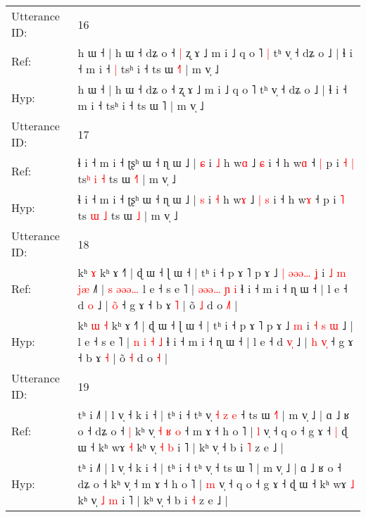 \documentclass[10pt]{article}
\DeclareRobustCommand{\hl}[1]{{\textcolor{red}{#1}}}
\begin{document}
\begin{longtable}{ll}
 \\
\midrule
Utterance ID: & 16 \\
Ref: & h ɯ ˧ | h ɯ ˧ dʑ o ˧\hl{ }\hl{|} ʐ ɤ ˩ m i ˩ q o ˥\hl{ }\hl{|} tʰ v̩ ˧ dʑ o ˩ | ɬ i ˧ m i ˧\hl{ }\hl{|} tsʰ i ˧ ts ɯ \hl{˧}˥ | m v̩ ˩
 \\
Hyp: & h ɯ ˧ | h ɯ ˧ dʑ o ˧\hl{}\hl{} ʐ ɤ ˩ m i ˩ q o ˥\hl{}\hl{} tʰ v̩ ˧ dʑ o ˩ | ɬ i ˧ m i ˧\hl{}\hl{} tsʰ i ˧ ts ɯ \hl{}˥ | m v̩ ˩
 \\
\midrule
Utterance ID: & 17 \\
Ref: & ɬ i ˧ m i ˧ ʈʂʰ ɯ ˧ ɳ ɯ ˩ | \hl{ɕ} i \hl{˩} h w\hl{ɑ} ˩\hl{}\hl{} \hl{ɕ} i ˧ h w\hl{ɑ} ˧\hl{ }\hl{|} p i\hl{ }\hl{˧} \hl{|} ts\hl{ʰ} \hl{i} \hl{˧} ts ɯ \hl{˧}\hl{˥} | m v̩ ˩
 \\
Hyp: & ɬ i ˧ m i ˧ ʈʂʰ ɯ ˧ ɳ ɯ ˩ | \hl{s} i \hl{˧} h w\hl{ɤ} ˩\hl{ }\hl{|} \hl{s} i ˧ h w\hl{ɤ} ˧\hl{}\hl{} p i\hl{}\hl{} \hl{˥} ts\hl{} \hl{ɯ} \hl{˩} ts ɯ \hl{}\hl{˩} | m v̩ ˩
 \\
\midrule
Utterance ID: & 18 \\
Ref: & kʰ\hl{}\hl{} \hl{ɤ} kʰ ɤ ˧˥ | ɖ ɯ ˧ ɭ ɯ ˧ | tʰ i ˧ p ɤ ˥ p ɤ ˩\hl{ }\hl{|}\hl{ }\hl{ə}\hl{ə}\hl{ə}\hl{…} \hl{ʝ} i \hl{˩} \hl{m} \hl{j}\hl{æ} ˩\hl{˥} |\hl{ }\hl{s}\hl{ }\hl{ə}\hl{ə}\hl{ə}\hl{…} l e ˧ s e ˥ | \hl{ə}\hl{ə}\hl{ə}\hl{…} \hl{ɲ} \hl{i} ɬ i ˧ m i ˧ ɳ ɯ ˧ | l e ˧ d \hl{}\hl{o} ˩ |\hl{}\hl{} \hl{o}\hl{̃} ˧ g ɤ ˧ b ɤ \hl{˥} | õ \hl{˩} d o \hl{˩}\hl{˥} |
 \\
Hyp: & kʰ\hl{ }\hl{ɯ} \hl{˧} kʰ ɤ ˧˥ | ɖ ɯ ˧ ɭ ɯ ˧ | tʰ i ˧ p ɤ ˥ p ɤ ˩\hl{}\hl{}\hl{}\hl{}\hl{}\hl{}\hl{} \hl{m} i \hl{˧} \hl{s} \hl{}\hl{ɯ} ˩\hl{} |\hl{}\hl{}\hl{}\hl{}\hl{}\hl{}\hl{} l e ˧ s e ˥ | \hl{}\hl{n}\hl{ }\hl{i} \hl{˧} \hl{˩} ɬ i ˧ m i ˧ ɳ ɯ ˧ | l e ˧ d \hl{v}\hl{̩} ˩ |\hl{ }\hl{h} \hl{v}\hl{̩} ˧ g ɤ ˧ b ɤ \hl{˧} | õ \hl{˧} d o \hl{}\hl{˧} |
 \\
\midrule
Utterance ID: & 19 \\
Ref: & tʰ i ˩˥ | l v̩ ˧ k i ˧ | tʰ i ˧ tʰ v̩\hl{ }\hl{˧}\hl{ }\hl{z}\hl{ }\hl{e} ˧ ts ɯ \hl{˧}˥ | m v̩ ˩ | ɑ ˩ ʁ o ˧ dʑ o ˧\hl{ }\hl{|} kʰ v̩\hl{ }\hl{˧}\hl{ }\hl{ʁ}\hl{ }\hl{o} ˧ m ɤ ˧ h o ˥ | \hl{l} v̩ ˧ q o ˧ g ɤ ˧\hl{ }\hl{|} ɖ ɯ ˧ kʰ wɤ \hl{˧} kʰ v̩ \hl{˧} \hl{b} i ˥ | kʰ v̩ ˧ b i \hl{˥} z e ˩ |
 \\
Hyp: & tʰ i ˩˥ | l v̩ ˧ k i ˧ | tʰ i ˧ tʰ v̩\hl{}\hl{}\hl{}\hl{}\hl{}\hl{} ˧ ts ɯ \hl{}˥ | m v̩ ˩ | ɑ ˩ ʁ o ˧ dʑ o ˧\hl{}\hl{} kʰ v̩\hl{}\hl{}\hl{}\hl{}\hl{}\hl{} ˧ m ɤ ˧ h o ˥ | \hl{m} v̩ ˧ q o ˧ g ɤ ˧\hl{}\hl{} ɖ ɯ ˧ kʰ wɤ \hl{˩} kʰ v̩ \hl{˩} \hl{m} i ˥ | kʰ v̩ ˧ b i \hl{˧} z e ˩ |
 \\

\end{longtable}
\end{document}
